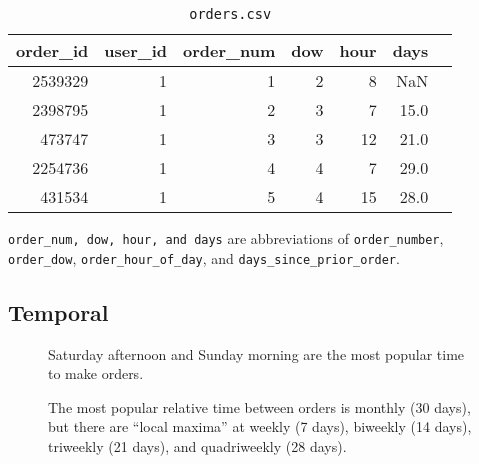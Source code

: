 \documentclass[handout]{beamer}
\begin{document}
\begin{frame}
\begin{table}[h]
  \centering
  \caption{\texttt{orders.csv}}
  \label{tab:orders}
{\ttfamily
  \begin{tabular}{rrrrrrr}
    \toprule
    order\_id & user\_id & order\_num & dow & hour & days \\
    \midrule
    2539329   & 1             & 1             & 2          & 8                 & NaN               \\
    2398795   & 1             & 2             & 3          & 7                 & 15.0              \\
    473747    & 1             & 3             & 3          & 12                & 21.0              \\
    2254736   & 1            & 4             & 4          & 7                 & 29.0              \\
    431534    & 1             & 5             & 4          & 15                & 28.0              \\
    \bottomrule
  \end{tabular}
  }
\end{table}
\texttt{order\_num, dow, hour, \textsf{and} days} are abbreviations of \texttt{order\_number}, \texttt{order\_dow}, \texttt{order\_hour\_of\_day}, and \texttt{days\_since\_prior\_order}.


\end{frame}

\subsection{Temporal}


\begin{frame}
\begin{figure}[p]
    \begin{center}
    \end{center}
    \caption[Heatmap of order times]{Saturday afternoon and Sunday morning are the most popular time to make
orders.}
     \label{fig:dow-vs-hr-order-heatmap}
\end{figure}

\end{frame}



\begin{frame}
 \begin{figure}[p]
\begin{center}
\caption[Histogram of order frequency]{The most popular relative time between orders is monthly (30
days), but there are ``local maxima'' at weekly (7 days), biweekly (14
days), triweekly (21 days), and quadriweekly (28 days).}
\label{fig:days-histogram}
\end{center}
\end{figure}
\end{frame}
\end{document}
